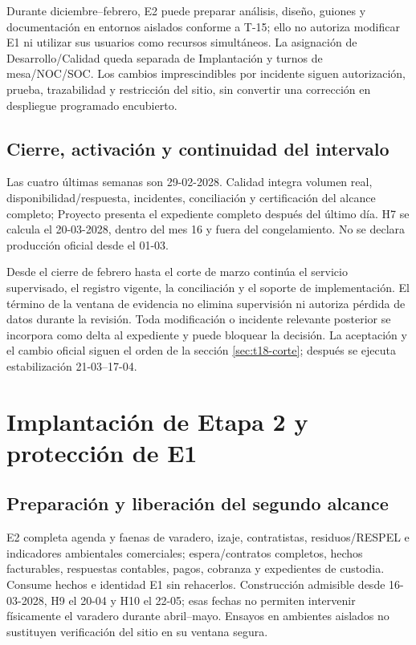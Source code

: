 Durante diciembre--febrero, E2 puede preparar análisis, diseño, guiones y documentación en entornos aislados conforme a T-15; ello no autoriza modificar E1 ni utilizar sus usuarios como recursos simultáneos. La asignación de Desarrollo/Calidad queda separada de Implantación y turnos de mesa/NOC/SOC. Los cambios imprescindibles por incidente siguen autorización, prueba, trazabilidad y restricción del sitio, sin convertir una corrección en despliegue programado encubierto.

\subsection{Cierre, activación y continuidad del intervalo}
Las cuatro últimas semanas son 29-02-2028. Calidad integra volumen real, disponibilidad/respuesta, incidentes, conciliación y certificación del alcance completo; Proyecto presenta el expediente completo después del último día. H7 se calcula el 20-03-2028, dentro del mes 16 y fuera del congelamiento. No se declara producción oficial desde el 01-03.

Desde el cierre de febrero hasta el corte de marzo continúa el servicio supervisado, el registro vigente, la conciliación y el soporte de implementación. El término de la ventana de evidencia no elimina supervisión ni autoriza pérdida de datos durante la revisión. Toda modificación o incidente relevante posterior se incorpora como delta al expediente y puede bloquear la decisión. La aceptación y el cambio oficial siguen el orden de la sección \ref{sec:t18-corte}; después se ejecuta estabilización 21-03--17-04.

\section{Implantación de Etapa 2 y protección de E1}\label{sec:t18-e2}
\subsection{Preparación y liberación del segundo alcance}
E2 completa agenda y faenas de varadero, izaje, contratistas, residuos/RESPEL e indicadores ambientales comerciales; espera/contratos completos, hechos facturables, respuestas contables, pagos, cobranza y expedientes de custodia. Consume hechos e identidad E1 sin rehacerlos. Construcción admisible desde 16-03-2028, H9 el 20-04 y H10 el 22-05; esas fechas no permiten intervenir físicamente el varadero durante abril--mayo. Ensayos en ambientes aislados no sustituyen verificación del sitio en su ventana segura.

